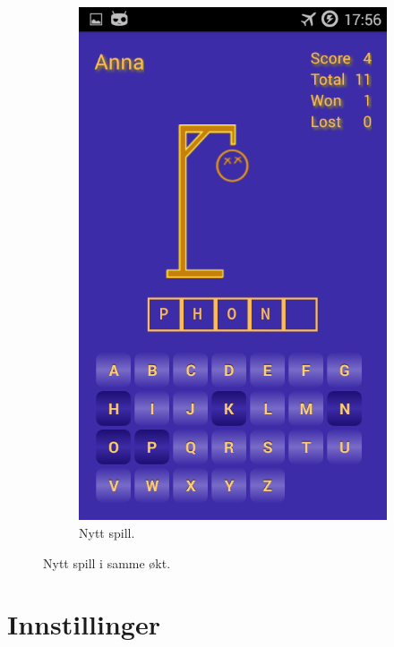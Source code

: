 \begin{figure}[ht]
\begin{subfigure}[b]{0.3\textwidth}
        \includegraphics[width=\textwidth]{./img/bruksanvisning/6.png}
        \caption{Nytt spill.}
        \label{fig:nyt_spill_samme_okt}
    \end{subfigure}
    \caption{Nytt spill i samme økt.}\label{fig:new_game_activities}
\end{figure}

\section{Innstillinger}





